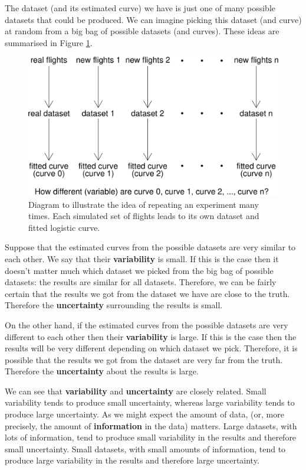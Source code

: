 \documentclass[
  11pt,
  british,
  openany, a4paper]{book}
\begin{document}
The dataset (and its estimated curve) we have is just one of many possible datasets that could be produced. We can imagine picking this dataset (and curve) at random from a big bag of possible datasets (and curves). These ideas are summarised in Figure \ref{fig:shuttlediagram}.

\begin{figure}

{\centering \includegraphics[width=0.75\linewidth]{images/shuttle_diagram} 

}

\caption{Diagram to illustrate the idea of repeating an experiment many times.  Each simulated set of flights leads to its own dataset and fitted logistic curve.}\label{fig:shuttlediagram}
\end{figure}

Suppose that the estimated curves from the possible datasets are very similar to each other. We say that their \textbf{variability} is small. If this is the case then it doesn't matter much which dataset we picked from the big bag of possible datasets: the results are similar for all datasets. Therefore, we can be fairly certain that the results we got from the dataset we have are close to the truth. Therefore the \textbf{uncertainty} surrounding the results is small.

On the other hand, if the estimated curves from the possible datasets are very different to each other then their \textbf{variability} is large. If this is the case then the results will be very different depending on which dataset we pick. Therefore, it is possible that the results we got from the dataset are very far from the truth. Therefore the \textbf{uncertainty} about the results is large.

We can see that \textbf{variability} and \textbf{uncertainty} are closely related. Small variability tends to produce small uncertainty, whereas large variability tends to produce large uncertainty. As we might expect the amount of data, (or, more precisely, the amount of \textbf{information} in the data) matters. Large datasets, with lots of information, tend to produce small variability in the results and therefore small uncertainty. Small datasets, with small amounts of information, tend to produce large variability in the results and therefore large uncertainty.
\end{document}
